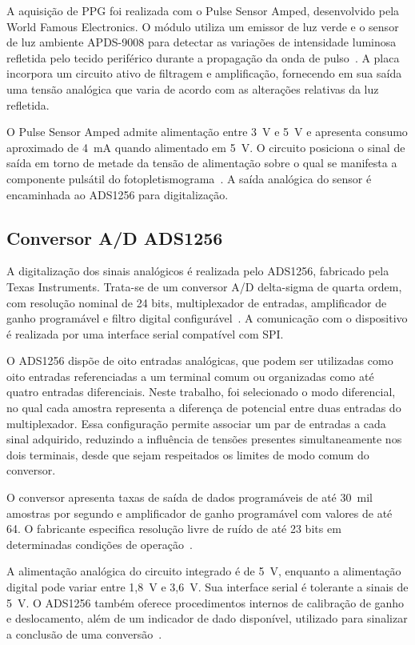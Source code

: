 \documentclass[a4paper,12pt]{fcte}
\begin{document}
A aquisição de PPG foi realizada com o Pulse Sensor Amped, desenvolvido pela World Famous Electronics. O módulo utiliza um emissor de luz verde e o sensor de luz ambiente APDS-9008 para detectar as variações de intensidade luminosa refletida pelo tecido periférico durante a propagação da onda de pulso~\cite{worldfamous_pulsesensor_amped}. A placa incorpora um circuito ativo de filtragem e amplificação, fornecendo em sua saída uma tensão analógica que varia de acordo com as alterações relativas da luz refletida.

O Pulse Sensor Amped admite alimentação entre 3~V e 5~V e apresenta consumo aproximado de 4~mA quando alimentado em 5~V. O circuito posiciona o sinal de saída em torno de metade da tensão de alimentação sobre o qual se manifesta a componente pulsátil do fotopletismograma~\cite{worldfamous_pulsesensor_amped}. A saída analógica do sensor é encaminhada ao ADS1256 para digitalização.

\subsection{Conversor A/D ADS1256}
\label{subsec:ads1256}

A digitalização dos sinais analógicos é realizada pelo ADS1256, fabricado pela Texas Instruments. Trata-se de um conversor A/D delta-sigma de quarta ordem, com resolução nominal de 24 bits, multiplexador de entradas, amplificador de ganho programável e filtro digital configurável~\cite{ti_ads1256}. A comunicação com o dispositivo é realizada por uma interface serial compatível com SPI.

O ADS1256 dispõe de oito entradas analógicas, que podem ser utilizadas como oito entradas referenciadas a um terminal comum ou organizadas como até quatro entradas diferenciais. Neste trabalho, foi selecionado o modo diferencial, no qual cada amostra representa a diferença de potencial entre duas entradas do multiplexador. Essa configuração permite associar um par de entradas a cada sinal adquirido, reduzindo a influência de tensões presentes simultaneamente nos dois terminais, desde que sejam respeitados os limites de modo comum do conversor.

O conversor apresenta taxas de saída de dados programáveis de até 30~mil amostras por segundo e amplificador de ganho programável com valores de até 64. O fabricante especifica resolução livre de ruído de até 23 bits em determinadas condições de operação~\cite{ti_ads1256}.

A alimentação analógica do circuito integrado é de 5~V, enquanto a alimentação digital pode variar entre 1,8~V e 3,6~V. Sua interface serial é tolerante a sinais de 5~V. O ADS1256 também oferece procedimentos internos de calibração de ganho e deslocamento, além de um indicador de dado disponível, utilizado para sinalizar a conclusão de uma conversão~\cite{ti_ads1256}.
\end{document}
